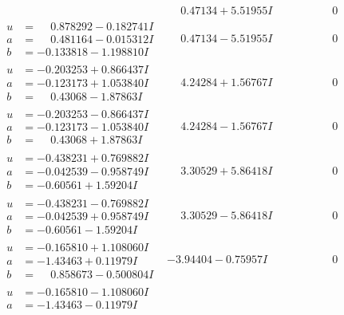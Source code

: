 \documentclass[1p]{elsarticle_modified}
\theoremstyle{definition}
\begin{document}
$$\begin{array}{c|c|c}
 & \phantom{-}0.47134 + 5.51955 I & \phantom{-0.000000 } 0 \\ \hline\begin{aligned}
u &= \phantom{-}0.878292 - 0.182741 I \\
a &= \phantom{-}0.481164 - 0.015312 I \\
b &= -0.133818 - 1.198810 I\end{aligned}
 & \phantom{-}0.47134 - 5.51955 I & \phantom{-0.000000 } 0 \\ \hline\begin{aligned}
u &= -0.203253 + 0.866437 I \\
a &= -0.123173 + 1.053840 I \\
b &= \phantom{-}0.43068 - 1.87863 I\end{aligned}
 & \phantom{-}4.24284 + 1.56767 I & \phantom{-0.000000 } 0 \\ \hline\begin{aligned}
u &= -0.203253 - 0.866437 I \\
a &= -0.123173 - 1.053840 I \\
b &= \phantom{-}0.43068 + 1.87863 I\end{aligned}
 & \phantom{-}4.24284 - 1.56767 I & \phantom{-0.000000 } 0 \\ \hline\begin{aligned}
u &= -0.438231 + 0.769882 I \\
a &= -0.042539 - 0.958749 I \\
b &= -0.60561 + 1.59204 I\end{aligned}
 & \phantom{-}3.30529 + 5.86418 I & \phantom{-0.000000 } 0 \\ \hline\begin{aligned}
u &= -0.438231 - 0.769882 I \\
a &= -0.042539 + 0.958749 I \\
b &= -0.60561 - 1.59204 I\end{aligned}
 & \phantom{-}3.30529 - 5.86418 I & \phantom{-0.000000 } 0 \\ \hline\begin{aligned}
u &= -0.165810 + 1.108060 I \\
a &= -1.43463 + 0.11979 I \\
b &= \phantom{-}0.858673 - 0.500804 I\end{aligned}
 & -3.94404 - 0.75957 I & \phantom{-0.000000 } 0 \\ \hline\begin{aligned}
u &= -0.165810 - 1.108060 I \\
a &= -1.43463 - 0.11979 I \\

\end{aligned}
\end{array}$$
\end{document}
